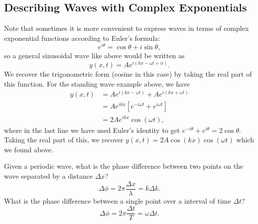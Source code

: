 \documentclass[../classical_mechanics.tex]{subfiles}
\begin{document}
        \subsection{Describing Waves with Complex Exponentials}\label{subsec:describing-waves-with-complex-exponentials}
            Note that sometimes it is more convenient to express waves in terms of complex exponential functions according to Euler's formula:
            \begin{equation}
                e^{i\theta}=\cos\theta+i\sin\theta,
            \end{equation}
            so a general sinusoidal wave like above would be written as
            \begin{equation}
                y(x,t)=Ae^{i(kx-\omega t+\phi)}.
            \end{equation}
            We recover the trigonometric form (cosine in this case) by taking the real part of this function.
            For the standing wave example above, we have
            \begin{align}
                y(x,t)&=Ae^{i(kx-\omega t)}+Ae^{i(kx+\omega t)}\\
                &=Ae^{ikx}\left[e^{-i\omega t}+e^{i\omega t}\right]\\
                &=2Ae^{ikx}\cos(\omega t),
            \end{align}
            where in the last line we have used Euler's identity to get $e^{-i\theta}+e^{i\theta}=2\cos\theta$.
            Taking the real part of this, we recover $y(x,t)=2A\cos(kx)\cos(\omega t)$ which we found above.
            \begin{example}
                Given a periodic wave, what is the phase difference between two points on the wave separated by a distance $\Delta x$?
                \begin{equation}
                    \Delta\phi=2\pi\frac{\Delta x}{\lambda}=k\Delta k.
                \end{equation}
                What is the phase difference between a single point over a interval of time $\Delta t$?
                \begin{equation}
                    \Delta\phi=2\pi\frac{\Delta t}{T}=\omega\Delta t.
                \end{equation}
            \end{example}
\end{document}
